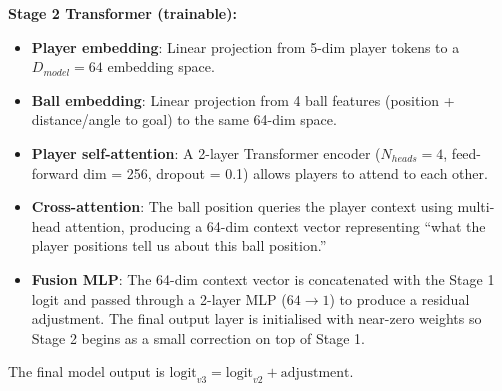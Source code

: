 \documentclass{article}
\begin{document}
\textbf{Stage 2 Transformer (trainable):}
\begin{itemize}
    \item \textbf{Player embedding}: Linear projection from 5-dim player tokens to a $D_{model} = 64$ embedding space.
    \item \textbf{Ball embedding}: Linear projection from 4 ball features (position + distance/angle to goal) to the same 64-dim space.
    \item \textbf{Player self-attention}: A 2-layer Transformer encoder ($N_{heads} = 4$, feed-forward dim = 256, dropout = 0.1) allows players to attend to each other.
    \item \textbf{Cross-attention}: The ball position queries the player context using multi-head attention, producing a 64-dim context vector representing ``what the player positions tell us about this ball position.''
    \item \textbf{Fusion MLP}: The 64-dim context vector is concatenated with the Stage 1 logit and passed through a 2-layer MLP ($64 \to 1$) to produce a residual adjustment. The final output layer is initialised with near-zero weights so Stage 2 begins as a small correction on top of Stage 1.
\end{itemize}

The final model output is $\text{logit}_{v3} = \text{logit}_{v2} + \text{adjustment}$.
\end{document}
